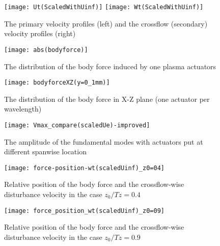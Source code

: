 \documentclass{AIAA}
\begin{document}
\begin{figure}
\centering
  \texttt{[image: Ut(ScaledWithUinf)]} \texttt{[image: Wt(ScaledWithUinf)]}
  \caption{The primary velocity profiles (left) and the crossflow (secondary) velocity profiles (right)}%
  \label{f:BLvelocityprofile}
\end{figure}

\begin{figure}
\centering
  \texttt{[image: abs(bodyforce)]}
  \caption{The distribution of the body force induced by one plasma actuators}%
  \label{f:forceshape}
\end{figure}

\begin{figure}
\centering
  \texttt{[image: bodyforceXZ(y=0\_1mm)]}
  \caption{The distribution of the body force in X-Z plane (one actuator per wavelength)}%
  \label{f:force_XZ_1perwavelength}
\end{figure}

\begin{figure}
\centering
  \texttt{[image: Vmax\_compare(scaledUe)-improved]}
  \caption{The amplitude of the fundamental modes with actuators put at different spanwise location}%
  \label{f:bestworst}
\end{figure}

\begin{figure}
\centering
  \texttt{[image: force-position-wt(scaledUinf)\_z0=04]}
  \caption{Relative position of the body force and the crossflow-wise disturbance velocity in the case $z_0/Tz=0.4$}%
  \label{f:thebest}
\end{figure}

\begin{figure}
\centering
  \texttt{[image: force\_position\_wt(scaledUinf)\_z0=09]}
  \caption{Relative position of the body force and the crossflow-wise disturbance velocity in the case $z_0/Tz=0.9$}%
  \label{f:theworst}
\end{figure}
\end{document}
